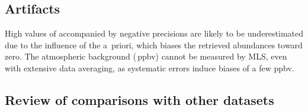 \begin{nofloatpages}
\begin{description}
  \evenstatusrule
  
  \item[Quality field:]  
  
  
  \item[Convergence field:]  
\end{description}
\end{nofloatpages}

\subsection{Artifacts}

High values of  accompanied by negative precisions are likely to be underestimated due to the influence of the a~priori, which biases the retrieved abundances toward zero. The atmospheric background  (\,ppbv) cannot be measured by MLS, even with extensive data averaging, as systematic errors induce biases of a few ppbv.


\subsection{Review of comparisons with other datasets}



